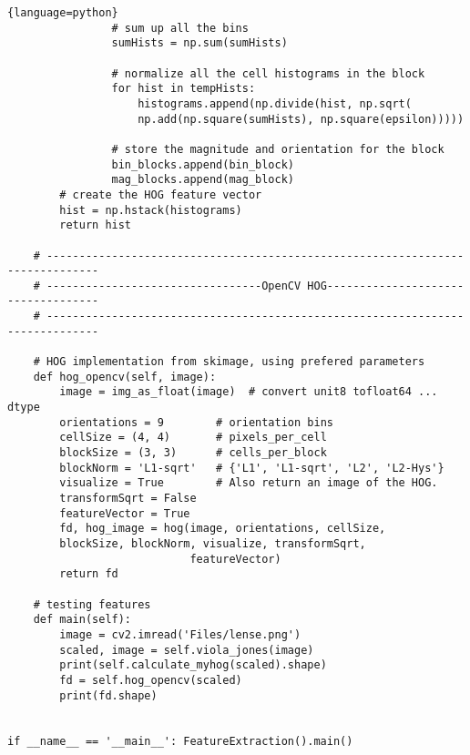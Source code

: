 \begin{lstlisting}{language=python}
                # sum up all the bins
                sumHists = np.sum(sumHists)
				
                # normalize all the cell histograms in the block
                for hist in tempHists:
                    histograms.append(np.divide(hist, np.sqrt(
                    np.add(np.square(sumHists), np.square(epsilon)))))

                # store the magnitude and orientation for the block
                bin_blocks.append(bin_block)
                mag_blocks.append(mag_block)
        # create the HOG feature vector
        hist = np.hstack(histograms)
        return hist

    # ------------------------------------------------------------------------------
    # ---------------------------------OpenCV HOG-----------------------------------
    # ------------------------------------------------------------------------------
	
    # HOG implementation from skimage, using prefered parameters
    def hog_opencv(self, image):
        image = img_as_float(image)  # convert unit8 tofloat64 ... dtype
        orientations = 9		# orientation bins
        cellSize = (4, 4)		# pixels_per_cell
        blockSize = (3, 3)		# cells_per_block
        blockNorm = 'L1-sqrt'	# {'L1', 'L1-sqrt', 'L2', 'L2-Hys'}
        visualize = True		# Also return an image of the HOG.
        transformSqrt = False
        featureVector = True
        fd, hog_image = hog(image, orientations, cellSize, 
        blockSize, blockNorm, visualize, transformSqrt,
                            featureVector)
        return fd
		
    # testing features 
    def main(self):
        image = cv2.imread('Files/lense.png')
		scaled, image = self.viola_jones(image)
        print(self.calculate_myhog(scaled).shape)
		fd = self.hog_opencv(scaled)
		print(fd.shape)


if __name__ == '__main__': FeatureExtraction().main()
\end{lstlisting}%

 \clearpage
